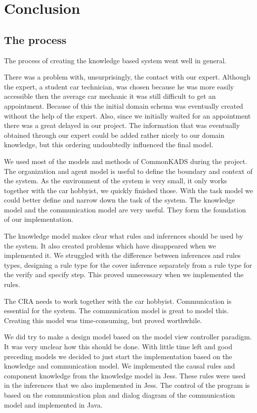 \section{Conclusion}
\subsection{The process}
The process of creating the knowledge based system went well in general.

There was a problem with, unsurprisingly, the contact with our expert. Although the expert, a student car technician, was chosen because he was more easily accessible then the average car mechanic it was still difficult to get an appointment. Because of this the initial domain schema was eventually created without the help of the expert. Also, since we initially waited for an appointment there was a great delayed in our project. The information that was eventually obtained through our expert could be added rather nicely to our domain knowledge, but this ordering undoubtedly influenced the final model.

We used most of the models and methods of CommonKADS during the project. The organization and agent
model is useful to define the boundary and context of the system. As the environment
of the system is very small, it only works together with the car hobbyist, we
quickly finished those. With the task model we could better define and narrow
down the task of the system. The knowledge model and the communication model
are very useful. They form the foundation of our implementation.

The knowledge
model makes clear what rules and inferences should be used by the system. It
also created problems which have disappeared when we implemented it. We struggled
with the
difference between inferences and rules types, designing a rule type for the
cover inference separately from a rule type for the verify and specify step. This
proved unnecessary when we implemented the rules.

The CRA needs to work together with the car hobbyist. Communication is essential
for the system. The communication model is great to model this. Creating this
model was time-consuming, but proved worthwhile.

We did try to make a design model based on the model view controller paradigm.
It was very unclear how this should be done. With little time left and good
preceding models we decided to just start the implementation based on the
knowledge and communication model. We implemented the causal rules and component
knowledge from the knowledge model in Jess. These rules were used in the
inferences that we also implemented in Jess. The control of the program is based
on the communication plan and dialog diagram of the communication model and
implemented in Java.

